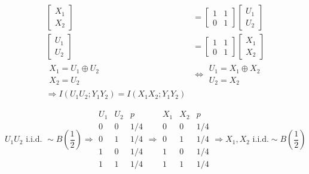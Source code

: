 \documentclass{article}
\theoremstyle{definition} %
\newcommand{\pfrac}[2]{\left( \frac{#1}{#2} \right)}
\def\U{\mathcal{U}}
\def\X{\mathcal{X}}
\begin{document}
\begin{align*}
  \begin{bmatrix}
    X_1\\X_2
  \end{bmatrix}
  &=
  \begin{bmatrix}
    1 & 1 \\ 0 & 1
  \end{bmatrix}
  \begin{bmatrix}
    U_1 \\ U_2
  \end{bmatrix}\\
  \begin{bmatrix}
    U_1\\U_2
  \end{bmatrix}
  &=
  \begin{bmatrix}
    1 & 1 \\ 0 & 1
  \end{bmatrix}
  \begin{bmatrix}
    X_1 \\ X_2
  \end{bmatrix}\\
  \begin{matrix}
  X_1 = U_1 \oplus U_2\\
  X_2 = U_2
  \end{matrix} &\iff
  \begin{matrix}
  U_1 = X_1 \oplus X_2\\
  U_2 = X_2
  \end{matrix}\\
  \Rightarrow I(U_1U_2;Y_1Y_2) = I(X_1 X_2 ; Y_1Y_2)
\end{align*}

\[
  U_1U_2 \text{ i.i.d. } \sim B\pfrac 1 2 \Rightarrow
  \begin{array}{cc|c}
    U_1 & U_2 & p\\
    \hline
    0 & 0 & 1/4\\
    0 & 1 & 1/4\\
    1 & 0 & 1/4\\
    1 & 1 & 1/4
  \end{array}
  \Rightarrow
  \begin{array}{cc|c}
    X_1 & X_2 & p\\
    \hline
    0 & 0 & 1/4\\
    0 & 1 & 1/4\\
    1 & 0 & 1/4\\
    1 & 1 & 1/4
  \end{array}
  \Rightarrow
  X_1, X_2 \text{ i.i.d.} \sim B\pfrac 1 2
\]
\end{document}

